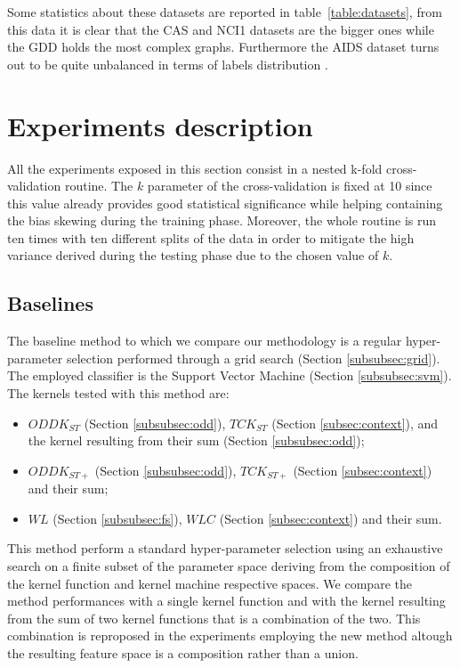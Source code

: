 Some statistics about these datasets are reported in table~\ref{table:datasets},
from this data it is clear that the CAS and NCI1 datasets are the bigger ones
while the GDD holds the most complex graphs.
Furthermore the AIDS dataset turns out to be quite unbalanced in terms of labels
distribution \cite{rtesselli}.  


\section{Experiments description}
\label{sec:description}

All the experiments exposed in this section consist in a nested k-fold
cross-validation routine.
The $k$ parameter of the cross-validation is fixed at 10 since this value
already provides good statistical significance while helping containing the bias
skewing during the training phase.
Moreover, the whole routine is run ten times with ten different splits of the
data in order to mitigate the high variance derived during the testing phase due to the
chosen value of $k$.

\subsection{Baselines}
\label{subsec:baselines}
The baseline method to which we compare our methodology is a regular hyper-parameter selection
performed through a grid search (Section \ref{subsubsec:grid}).
The employed classifier is the Support Vector Machine (Section \ref{subsubsec:svm}).
The kernels tested with this method are:
\begin{itemize}
    \item $ODDK_{ST}$ (Section \ref{subsubsec:odd}), $TCK_{ST}$ (Section \ref{subsec:context}), and the kernel resulting
        from their sum (Section \ref{subsubsec:odd});
    \item $ODDK_{ST+}$ (Section \ref{subsubsec:odd}), $TCK_{ST+}$ (Section \ref{subsec:context}) and their sum;
    \item $WL$ (Section \ref{subsubsec:fs}), $WLC$ (Section \ref{subsec:context}) and their sum.
\end{itemize}

This method perform a standard hyper-parameter selection using an exhaustive search
on a finite subset of the parameter space deriving from the composition of the
kernel function and kernel machine respective spaces.
We compare the method performances with a single kernel function and with the
kernel resulting from the sum of two kernel functions that is a combination of the two.
This combination is reproposed in the experiments employing the new method altough
the resulting feature space is a composition rather than a union.

